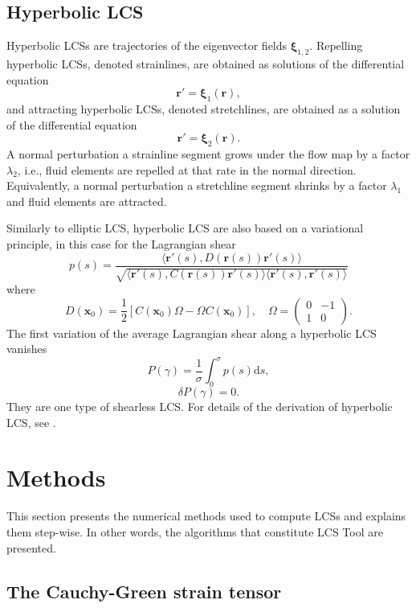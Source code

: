 \documentclass{article}
\begin{document}
\subsection{Hyperbolic LCS}
Hyperbolic LCSs are trajectories of the eigenvector fields $\boldsymbol \xi_{1,2}$. Repelling hyperbolic LCSs, denoted strainlines, are obtained as solutions of the differential equation
\begin{equation}
\boldsymbol r' = \boldsymbol \xi_1(\boldsymbol r),
\label{eq:strainline}
\end{equation}
and attracting hyperbolic LCSs, denoted stretchlines, are obtained as a solution of the differential equation
\[
\boldsymbol r' = \boldsymbol \xi_2(\boldsymbol r).
\]
A normal perturbation a strainline segment grows under the flow map by a factor $\lambda_2$, i.e., fluid elements are repelled at that rate in the normal direction. Equivalently, a normal perturbation a stretchline segment shrinks by a factor $\lambda_1$ and fluid elements are attracted.

Similarly to elliptic LCS, hyperbolic LCS are also based on a variational principle, in this case for the Lagrangian shear
\[
p(s) = \frac{\langle \boldsymbol r'(s), D(\boldsymbol r(s)) \boldsymbol r'(s)\rangle}{\sqrt{\langle \boldsymbol r'(s), C(\boldsymbol r(s)) \boldsymbol r'(s)\rangle \langle \boldsymbol r'(s), \boldsymbol r'(s)\rangle}}
\]
where
\[
D(\boldsymbol x_0) = \frac12[C(\boldsymbol x_0) \Omega - \Omega C(\boldsymbol x_0)], \quad \Omega = \begin{pmatrix}0&-1\\1&0\end{pmatrix}.
\]
The first variation of the average Lagrangian shear along a hyperbolic LCS vanishes
\[
P(\gamma) = \frac{1}{\sigma} \int_0^\sigma p(s) \text{d}s,
\]
\[
\delta P(\gamma) = 0.
\]
They are one type of shearless LCS. For details of the derivation of hyperbolic LCS, see \cite{farazmand13:_shearless}.

\clearpage

\section{Methods}

This section presents the numerical methods used to compute LCSs and explains them step-wise. In other words, the algorithms that constitute LCS Tool are presented.

\subsection{The Cauchy-Green strain tensor}
\end{document}
